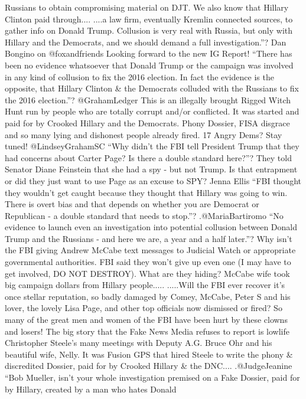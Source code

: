 Russians to obtain compromising material on DJT. We also know that
Hillary Clinton paid through.... ....a law firm, eventually Kremlin
connected sources, to gather info on Donald Trump. Collusion is very
real with Russia, but only with Hillary and the Democrats, and we should
demand a full investigation.''? Dan Bongino on @foxandfriends Looking
forward to the new IG Report! ``There has been no evidence whatsoever
that Donald Trump or the campaign was involved in any kind of collusion
to fix the 2016 election. In fact the evidence is the opposite, that
Hillary Clinton \& the Democrats colluded with the Russians to fix the
2016 election.''? @GrahamLedger This is an illegally brought Rigged
Witch Hunt run by people who are totally corrupt and/or conflicted. It
was started and paid for by Crooked Hillary and the Democrats. Phony
Dossier, FISA disgrace and so many lying and dishonest people already
fired. 17 Angry Dems? Stay tuned! @LindseyGrahamSC ``Why didn't the FBI
tell President Trump that they had concerns about Carter Page? Is there
a double standard here?''? They told Senator Diane Feinstein that she
had a spy - but not Trump. Is that entrapment or did they just want to
use Page as an excuse to SPY? Jenna Ellis ``FBI thought they wouldn't
get caught because they thought that Hillary was going to win. There is
overt bias and that depends on whether you are Democrat or Republican -
a double standard that needs to stop.''? .@MariaBartiromo ``No evidence
to launch even an investigation into potential collusion between Donald
Trump and the Russians - and here we are, a year and a half later.''?
Why isn't the FBI giving Andrew McCabe text messages to Judicial Watch
or appropriate governmental authorities. FBI said they won't give up
even one (I may have to get involved, DO NOT DESTROY). What are they
hiding? McCabe wife took big campaign dollars from Hillary people.....
.....Will the FBI ever recover it's once stellar reputation, so badly
damaged by Comey, McCabe, Peter S and his lover, the lovely Lisa Page,
and other top officials now dismissed or fired? So many of the great men
and women of the FBI have been hurt by these clowns and losers! The big
story that the Fake News Media refuses to report is lowlife Christopher
Steele's many meetings with Deputy A.G. Bruce Ohr and his beautiful
wife, Nelly. It was Fusion GPS that hired Steele to write the phony \&
discredited Dossier, paid for by Crooked Hillary \& the DNC....
.@JudgeJeanine ``Bob Mueller, isn't your whole investigation premised on
a Fake Dossier, paid for by Hillary, created by a man who hates Donald
